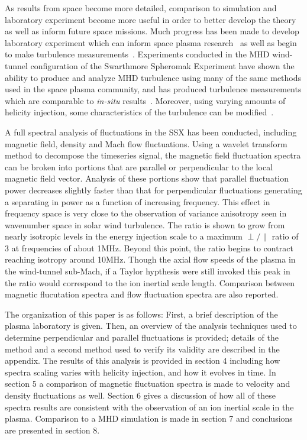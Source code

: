 \documentclass[aip,prl,amsmath,amssymb,reprint,superscriptaddress]{revtex4-1} %
\begin{document}
As results from space become more detailed, comparison to simulation and laboratory experiment become more useful in order to better develop the theory as well as inform future space missions. Much progress has been made to develop laboratory experiment which can inform space plasma research~\cite{howes12a} as well as begin to make turbulence measurements~\cite{ren11}.  Experiments conducted in the MHD wind-tunnel configuration of the Swarthmore Spheromak Experiment have shown the ability to produce and analyze MHD turbulence using many of the same methods used in the space plasma community, and has produced turbulence measurements which are comparable to \textit{in-situ} results~\cite{schaffner14a}. Moreover, using varying amounts of helicity injection, some characteristics of the turbulence can be modified~\cite{schaffner14b}.

A full spectral analysis of fluctuations in the SSX has been conducted, including magnetic field, density and Mach flow fluctuations. Using a wavelet transform method to decompose the timeseries signal, the magnetic field fluctuation spectra can be broken into portions that are parallel or perpendicular to the local magnetic field vector. Analysis of these portions show that parallel fluctuation power decreases slightly faster than that for perpendicular fluctuations generating a separating in power as a function of increasing frequency. This effect in frequency space is very close to the observation of variance anisotropy seen in wavenumber space in solar wind turbulence. The ratio is shown to grow from nearly isotropic levels in the energy injection scale to a maximum $\perp/\parallel$ ratio of 3 at frequencies of about 1MHz. Beyond this point, the ratio begins to contract reaching isotropy around 10MHz. Though the axial flow speeds of the plasma in the wind-tunnel sub-Mach, if a Taylor hypthesis were still invoked this peak in the ratio would correspond to the ion inertial scale length. Comparison between magnetic flucutation spectra and flow fluctuation spectra are also reported.

The organization of this paper is as follows: First, a brief description of the plasma laboratory is given. Then, an overview of the analysis techniques used to determine perpendicular and parallel fluctuations is provided; details of the method and a second method used to verify its validity are described in the appendix. The results of this analysis is provided in section 4 including how spectra scaling varies with helicity injection, and how it evolves in time. In section 5 a comparison of magnetic fluctuation spectra is made to velocity and density fluctuations as well. Section 6 gives a discussion of how all of these spectra results are consistent with the observation of an ion inertial scale in the plasma. Comparison to a MHD simulation is made in section 7 and conclusions are presented in section 8.
\end{document}
